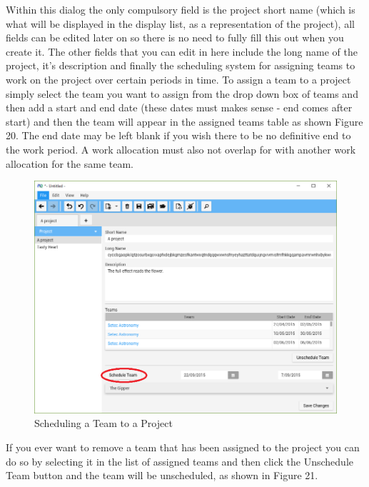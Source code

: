 Within this dialog the only compulsory field is the project short name (which is what will be displayed in the display list, as a representation of the project), all fields can be edited later on so there is no need to fully fill this out when you create it.
\newline
The other fields that you can edit in here include the long name of the project, it's description and finally the scheduling system for assigning teams to work on the project over certain periods in time. To assign a team to a project simply select the team you want to assign from the drop down box of teams and then add a start and end date (these dates must makes sense - end comes after start) and then the team will appear in the assigned teams table as shown Figure 20. The end date may be left blank if you wish there to be no definitive end to the work period. A work allocation must also not overlap for with another work allocation for the same team.

\begin{figure}[H]
\centering
\includegraphics[width=\textwidth]{images/screenshots/projects2.PNG}
\caption{Scheduling a Team to a Project}
\label{fig:new_project}
\end{figure}

If you ever want to remove a team that has been assigned to the project you can do so by selecting it in the list of assigned teams and then click the Unschedule Team button and the team will be unscheduled, as shown in Figure 21.


